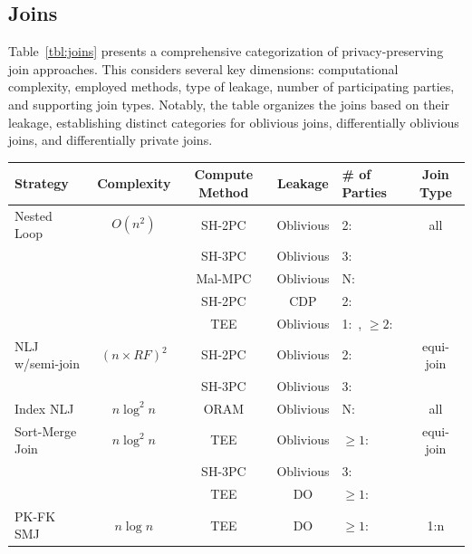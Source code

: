 \documentclass[11pt]{article}
\begin{document}
\subsection{Joins}

Table~\ref{tbl:joins} presents a comprehensive categorization of privacy-preserving join approaches. This considers several key dimensions: computational complexity, employed methods, type of leakage, number of participating parties, and supporting join types. Notably, the table organizes the joins based on their leakage, establishing distinct categories for oblivious joins, differentially oblivious joins, and differentially private joins. 


\begin{table}
    \centering
    \begin{tabular}{l|c|c|c|p{2.8cm}|c}
     {\bf Strategy}    & {\bf Complexity} &{\bf  Compute Method} & {\bf Leakage}  &{\bf  \# of Parties} & {\bf Join Type} \\
     \hline 
     Nested Loop & $O(n^2)$ & SH-2PC & Oblivious & 2:~\cite{bater2017smcql, vaultdb} & all \\
     
      &  &  SH-3PC & Oblivious  &  3:~\cite{volgushev2019conclave, liagouris2023secrecy} &  \\

      &  &  Mal-MPC & Oblivious  &  N:~\cite{li2023rescu} &  \\
     
      &  &  SH-2PC &   CDP &  2:~\cite{bater2018shrinkwrap, bater2020saqe} &  \\
       &  & TEE & Oblivious &  1:~\cite{li2008privacy}, $\geq2$:~\cite{dave2020oblivious}&  \\
       
     \hline
     NLJ w/semi-join & $(n \times RF)^2$ & SH-2PC & Oblivious & 2:  \cite{bater2017smcql}  & equi-join \\ 
    &  &SH-3PC  &  Oblivious  &  3:~\cite{chu2021differentially, liagouris2023secrecy} & \\ 
     \hline

    Index NLJ & $n \log ^2 n$ & ORAM & Oblivious & N:  \cite{chang2022towards}  & all \\ 
    \hline

    Sort-Merge Join & $n \log ^2 n$ & TEE & Oblivious & $\geq 1$: \cite{krastnikov13efficient, eskandarian2019oblidb, zheng2017opaque} & equi-join \\ 
                    &    & SH-3PC & Oblivious & 3:~\cite{li2024experimental} & \\
                    &    & TEE & DO & $\geq 1:$  \cite{chu2021differentially}& \\
                    \hline 
       PK-FK SMJ             & $n \log n$   & TEE & DO & $\geq 1$:~\cite{qin2022adore} & 1:n \\
     \hline
    

\end{tabular}
\end{table}
\end{document}

